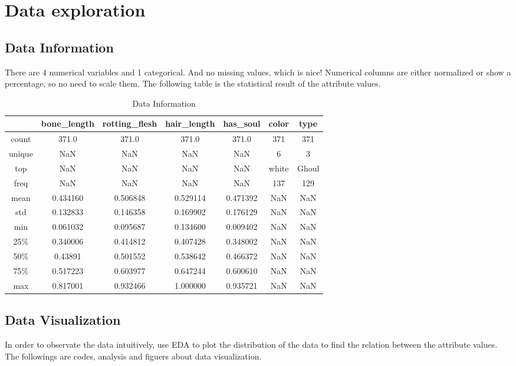 \section{Data exploration} \label{sec-data_exploration}

\subsection{Data Information}
There are 4 numerical variables and 1 categorical. And no missing values, which is nice! Numerical columns are either normalized or show a percentage, so no need to scale them. The following table is the statistical result of the attribute values.


\begin{table}[h]  \centering
	\caption{Data Information}
	\label{tbl:data information}
	\begin{tabular}{ccccccc}
		\hline
		& bone_length & rotting_flesh & hair_length & has_soul & color & type\\
		\hline
		count & 371.0 & 371.0 & 371.0 & 371.0 & 371 & 371 \\
		unique & NaN & NaN & NaN & NaN & 6 & 3 \\
		top & NaN & NaN & NaN & NaN & white & Ghoul \\
		freq & NaN & NaN & NaN & NaN & 137 & 129\\
		mean & 0.434160 & 0.506848 & 0.529114 & 0.471392 & NaN & NaN \\
		std & 0.132833 & 0.146358 & 0.169902 & 0.176129 & NaN & NaN \\
		min & 0.061032 & 0.095687 & 0.134600 & 0.009402 & NaN & NaN \\
		25\% & 0.340006 & 0.414812 & 0.407428 & 0.348002 & NaN & NaN \\
		50\% & 0.43891 & 0.501552 & 0.538642 & 0.466372 & NaN & NaN\\
		75\% & 0.517223 & 0.603977 & 0.647244 & 0.600610 & NaN & NaN\\
		max &  0.817001 & 0.932466 & 1.000000 & 0.935721 & NaN & NaN\\
		\hline 
	\end{tabular}
\end{table}


\subsection{Data Visualization}
In order to observate the data intuitively, use EDA to plot the distribution of the data to find the relation between the attribute values. The followings are codes, analysis and figuers about data visualization.\\

